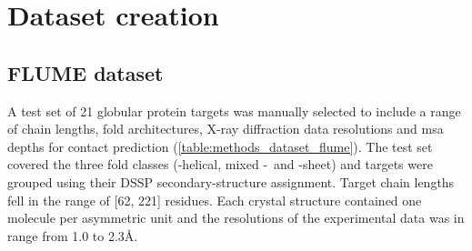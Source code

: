 \section{Dataset creation}
\subsection{FLUME dataset} \label{sec:methods_dataset_flume}
A test set of 21 globular protein targets was manually selected to include a range of chain lengths, fold architectures, X-ray diffraction data resolutions and \gls{msa} depths for contact prediction  (\cref{table:methods_dataset_flume}). The test set covered the three fold classes (\textalpha-helical, mixed \textalpha-\textbeta\ and \textbeta-sheet) and targets were grouped using their DSSP \cite{Kabsch1983-rr} secondary-structure assignment. Target chain lengths fell in the range of [62, 221] residues. Each crystal structure contained one molecule per asymmetric unit and the resolutions of the experimental data was in range from 1.0 to 2.3\AA.

